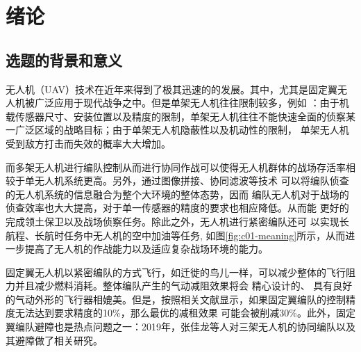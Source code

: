 %
%
%
%

\chapter{绪论}
\label{chap:intro}
\section{选题的背景和意义}
无人机（UAV）技术在近年来得到了极其迅速的的发展。其中，尤其是固定翼无人机被广泛应用于现代战争之中。但是单架无人机往往限制较多，例如
：由于机载传感器尺寸、安装位置以及精度的限制，单架无人机往往不能快速全面的侦察某一广泛区域的战略目标；由于单架无人机隐蔽性以及机动性的限制，
单架无人机受到敌方打击而失效的概率大大增加。

而多架无人机进行编队控制从而进行协同作战可以使得无人机群体的战场存活率相较于单无人机系统更高。另外，通过图像拼接、协同滤波等技术
可以将编队侦查的无人机系统的信息融合为整个大环境的整体态势，因而
编队无人机对于战场的侦查效率也大大提高，对于单一传感器的精度的要求也相应降低。从而能
更好的完成领土保卫以及战场侦察任务。除此之外，无人机进行紧密编队还可
以实现长航程、长航时任务中无人机的空中加油等任务, 如图\ref{fig:c01-meaning}所示，从而进一步提高了无人机的作战能力以及适应复杂战场环境的能力。

固定翼无人机以紧密编队的方式飞行，如迁徙的鸟儿一样，可以减少整体的飞行阻力并且减少燃料消耗。整体编队产生的气动减阻效果将会
精心设计的、
具有良好的气动外形的飞行器相媲美。但是，按照相关文献显示，如果固定翼编队的控制精度无法达到要求精度的10\%，那么最优的减租效果
可能会被削减30\%。\cite{Zhang2017Aerodynamics}此外，固定翼编队避障也是热点问题之一：2019年，张佳龙等人对三架无人机的协同编队以及
其避障做了相关研究。\cite{Zzhangjialong2019Collision}

